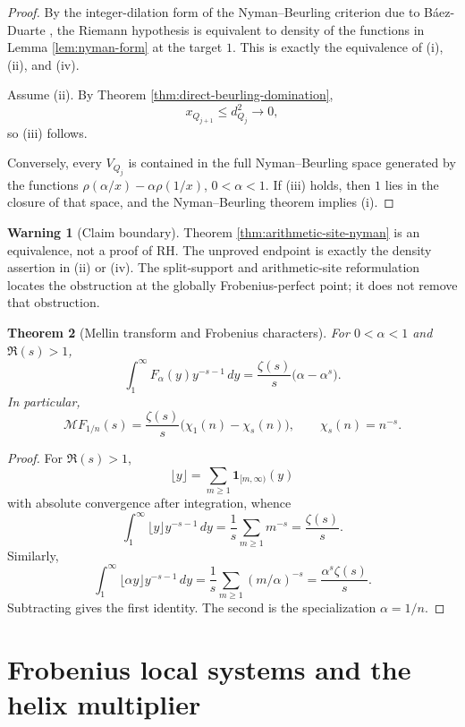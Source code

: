 \documentclass[11pt]{amsart}
\numberwithin{equation}{section}
\newtheorem{theorem}{Theorem}[section]
\theoremstyle{definition}
\newtheorem{warning}[theorem]{Warning}
\begin{document}
\begin{proof}
By the integer-dilation form of the Nyman--Beurling criterion due to
B\'aez-Duarte \cite{Nyman,Beurling,BaezDuarte}, the Riemann hypothesis is
equivalent to density of the functions in Lemma \ref{lem:nyman-form} at
the target $1$.  This is exactly the equivalence of (i), (ii), and (iv).

Assume (ii).  By Theorem \ref{thm:direct-beurling-domination},
\[
x_{Q_{j+1}}\leq d_{Q_j}^2\longrightarrow0,
\]
so (iii) follows.

Conversely, every $V_{Q_j}$ is contained in the full Nyman--Beurling
space generated by the functions
$\rho(\alpha/x)-\alpha\rho(1/x)$, $0<\alpha<1$.  If (iii) holds, then $1$
lies in the closure of that space, and the Nyman--Beurling theorem implies
(i).
\end{proof}

\begin{warning}[Claim boundary]
Theorem \ref{thm:arithmetic-site-nyman} is an equivalence, not a proof of
RH.  The unproved endpoint is exactly the density assertion in (ii) or
(iv).  The split-support and arithmetic-site reformulation locates the
obstruction at the globally Frobenius-perfect point; it does not remove
that obstruction.
\end{warning}

\begin{theorem}[Mellin transform and Frobenius characters]
\label{thm:mellin-frobenius-characters}
For $0<\alpha<1$ and $\Re(s)>1$,
\[
\int_1^\infty F_\alpha(y)y^{-s-1}\,dy
=
\frac{\zeta(s)}s\bigl(\alpha-\alpha^s\bigr).
\]
In particular,
\[
\mathcal MF_{1/n}(s)
=
\frac{\zeta(s)}s
\bigl(\chi_1(n)-\chi_s(n)\bigr),
\qquad
\chi_s(n)=n^{-s}.
\]
\end{theorem}

\begin{proof}
For $\Re(s)>1$,
\[
\lfloor y\rfloor=\sum_{m\geq1}\mathbf1_{[m,\infty)}(y)
\]
with absolute convergence after integration, whence
\[
\int_1^\infty\lfloor y\rfloor y^{-s-1}\,dy
=\frac1s\sum_{m\geq1}m^{-s}
=\frac{\zeta(s)}s.
\]
Similarly,
\[
\int_1^\infty\lfloor\alpha y\rfloor y^{-s-1}\,dy
=\frac1s\sum_{m\geq1}(m/\alpha)^{-s}
=\frac{\alpha^s\zeta(s)}s.
\]
Subtracting gives the first identity.  The second is the specialization
$\alpha=1/n$.
\end{proof}

\section{Frobenius local systems and the helix multiplier}
\label{sec:helix-local-system}
\end{document}
